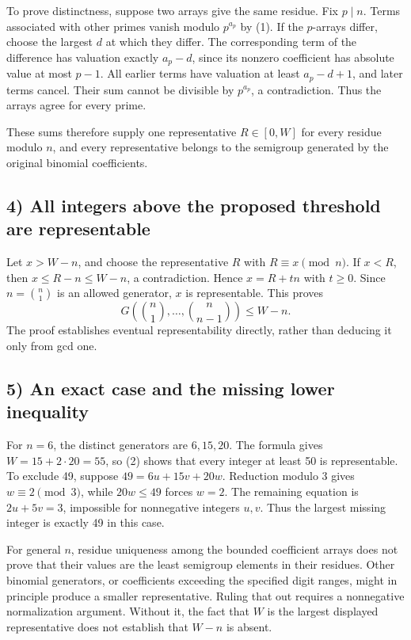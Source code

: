 To prove distinctness, suppose two arrays give the same residue. Fix $p\mid n$. Terms associated with other primes vanish modulo $p^{a_p}$ by (1). If the $p$-arrays differ, choose the largest $d$ at which they differ. The corresponding term of the difference has valuation exactly $a_p-d$, since its nonzero coefficient has absolute value at most $p-1$. All earlier terms have valuation at least $a_p-d+1$, and later terms cancel. Their sum cannot be divisible by $p^{a_p}$, a contradiction. Thus the arrays agree for every prime.

These sums therefore supply one representative $R\in[0,W]$ for every residue modulo $n$, and every representative belongs to the semigroup generated by the original binomial coefficients.

\subsection*{4) All integers above the proposed threshold are representable}
Let $x>W-n$, and choose the representative $R$ with $R\equiv x\pmod n$. If $x<R$, then $x\le R-n\le W-n$, a contradiction. Hence $x=R+tn$ with $t\ge0$. Since $n=\binom n1$ is an allowed generator, $x$ is representable. This proves
\[G\!\left(\binom n1,\ldots,\binom n{n-1}\right)\le W-n.\tag{2}\]
The proof establishes eventual representability directly, rather than deducing it only from gcd one.

\subsection*{5) An exact case and the missing lower inequality}
For $n=6$, the distinct generators are $6,15,20$. The formula gives $W=15+2\cdot20=55$, so (2) shows that every integer at least 50 is representable. To exclude 49, suppose $49=6u+15v+20w$. Reduction modulo 3 gives $w\equiv2\pmod3$, while $20w\le49$ forces $w=2$. The remaining equation is $2u+5v=3$, impossible for nonnegative integers $u,v$. Thus the largest missing integer is exactly 49 in this case.

For general $n$, residue uniqueness among the bounded coefficient arrays does not prove that their values are the least semigroup elements in their residues. Other binomial generators, or coefficients exceeding the specified digit ranges, might in principle produce a smaller representative. Ruling that out requires a nonnegative normalization argument. Without it, the fact that $W$ is the largest displayed representative does not establish that $W-n$ is absent.

